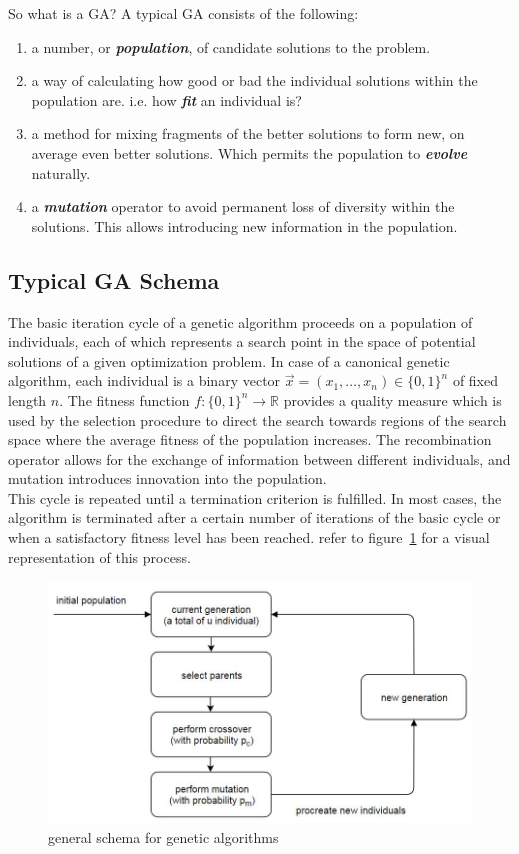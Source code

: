 \documentclass[12pt]{article}
\newcommand{\textem}[1]{\textbf{\textit{#1}}}
\begin{document}
\noindent
So what is a GA? A typical GA consists of the following:
\vspace{-5mm}
\begin{enumerate}
\setlength{\parskip}{0em}
\item a number, or \textem{population}, of candidate solutions to the problem.
\item a way of calculating how good or bad the individual solutions within the
population are. i.e. how \textem{fit} an individual is?
\item a method for mixing fragments of the better solutions to form new, on
average even better solutions. Which permits the population to \textem{evolve} naturally.
\item a \textem{mutation} operator to avoid permanent loss of diversity within the
solutions. This allows introducing new information in the population.
\end{enumerate}

\subsection{Typical GA Schema}
The basic iteration cycle of a genetic algorithm proceeds on a population
of individuals, each of which represents a search point in the space
of potential solutions of a given optimization problem.
In case of a canonical genetic algorithm, each individual is a binary vector
$ \vec{x} = ( x_1, \dots, x_n ) \in \{0, 1\}^n $
of fixed length $n$. The fitness function
$ f: \{0, 1\}^n \rightarrow \mathbb{R} $
provides a quality measure which is used by the selection procedure to direct
the search towards regions of the search space where the
average fitness of the population increases. The recombination operator
allows for the exchange of information between different individuals, and
mutation introduces innovation into the population. \\
This cycle is repeated until a termination criterion is fulfilled.
In most cases, the algorithm is terminated after a certain number of
iterations of the basic cycle or when a satisfactory fitness
level has been reached.
refer to figure~\ref{fig:ga} for a visual representation of this process.

\begin{figure}[!htbp]
\centering
\includegraphics[width=1\textwidth]{ga}
\caption{general schema for genetic algorithms}
\label{fig:ga}
\end{figure}
\end{document}
